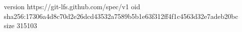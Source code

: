 version https://git-lfs.github.com/spec/v1
oid sha256:17306a4d8c70d2e26dcd43532a7589b5b1e63f312ff4f1c4563d32e7adeb20bc
size 315103
